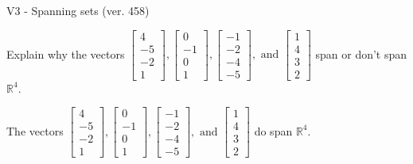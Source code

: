 \begin{exercise}
  \begin{exerciseTitle}V3 - Spanning sets (ver. 458)\end{exerciseTitle}
  \begin{exerciseStatement}
    Explain why the vectors \(\left[\begin{array}{r}
4 \\
-5 \\
-2 \\
1
\end{array}\right] , \left[\begin{array}{r}
0 \\
-1 \\
0 \\
1
\end{array}\right] , \left[\begin{array}{r}
-1 \\
-2 \\
-4 \\
-5
\end{array}\right] , \text{ and } \left[\begin{array}{r}
1 \\
4 \\
3 \\
2
\end{array}\right]\) span or don't span \(\mathbb{R}^4\). 
	


  \end{exerciseStatement}
  \begin{exerciseAnswer}
   The vectors \(\left[\begin{array}{r}
4 \\
-5 \\
-2 \\
1
\end{array}\right] , \left[\begin{array}{r}
0 \\
-1 \\
0 \\
1
\end{array}\right] , \left[\begin{array}{r}
-1 \\
-2 \\
-4 \\
-5
\end{array}\right] , \text{ and } \left[\begin{array}{r}
1 \\
4 \\
3 \\
2
\end{array}\right]\) 
  	 do  
	span \(\mathbb{R}^4\).
  


  \end{exerciseAnswer}
\end{exercise}